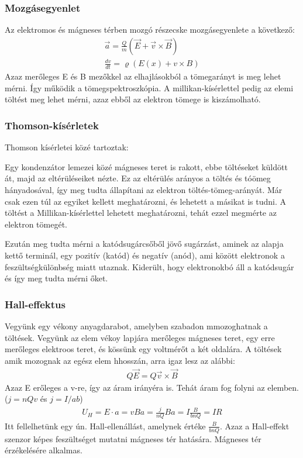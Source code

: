 \documentclass{article}
\begin{document}
\subsubsection{Mozgásegyenlet}
Az elektromos és mágneses térben mozgó részecske mozgásegyenlete a következő: 
\begin{gather*}
\vec{a} = \frac{Q}{m}(\vec{E} + \vec{v} \times \vec{B}) \\
\frac{dv}{dt} = \varrho (E(x)+v \times B)
\end{gather*}
Azaz merőleges E és B mezőkkel az elhajlásokból a tömegarányt is meg lehet mérni. Így működik a tömegspektroszkópia. A millikan-kísérlettel pedig az elemi töltést meg lehet mérni, azaz ebből az elektron tömege is kiszámolható.
\subsubsection{Thomson-kísérletek}
Thomson kísérletei közé tartoztak:

Egy kondenzátor lemezei közé mágneses teret is rakott, ebbe töltéseket küldött át, majd az eltérüléseiket nézte. Ez az eltérülés arányos a töltés és tóömeg hányadosával, így meg tudta állapítani az elektron töltés-tömeg-arányát. Már csak ezen túl az egyiket kellett meghatározni, és lehetett a másikat is tudni. A töltést a Millikan-kísérlettel lehetett meghatározni, tehát ezzel megmérte az elektron tömegét.

Ezután meg tudta mérni a katódsugárcsőből jövő sugárzást, aminek az alapja kettő terminál, egy pozitív (katód) és negatív (anód), ami között elektronok a feszültségkülönbség miatt utaznak. Kiderült, hogy elektronokbó áll a katódsugár és így meg tudta mérni őket.
\subsubsection{Hall-effektus}
Vegyünk egy vékony anyagdarabot, amelyben szabadon mmozoghatnak a töltések. Vegyünk az elem vékoy lapjára merőleges mágneses teret, egy erre merőleges elektroos teret, és kössünk egy voltmérőt a két oldalára. A töltések amik mozognak az egész elem hhosszán, arra igaz lesz az alábbi:
\begin{gather*}
Q\vec{E} = Q\vec{v} \times \vec{B}
\end{gather*}
Azaz E erőleges a v-re, így az áram irányéra is. Tehát áram fog folyni az elemben. ($j=nQv$ és $j=I/ab$)
\begin{gather*}
U_H = E\cdot a = vBa = \frac{j}{nQ} Ba = I\frac{B}{bnQ} = IR
\end{gather*}
Itt fellelhetünk egy ún. Hall-ellenállást, amelynek értéke $\frac{B}{bnQ}$. Azaz a Hall-effekt szenzor képes feszültséget mutatni mágneses tér hatására. Mágneses tér érzékelésére alkalmas.
\end{document}
